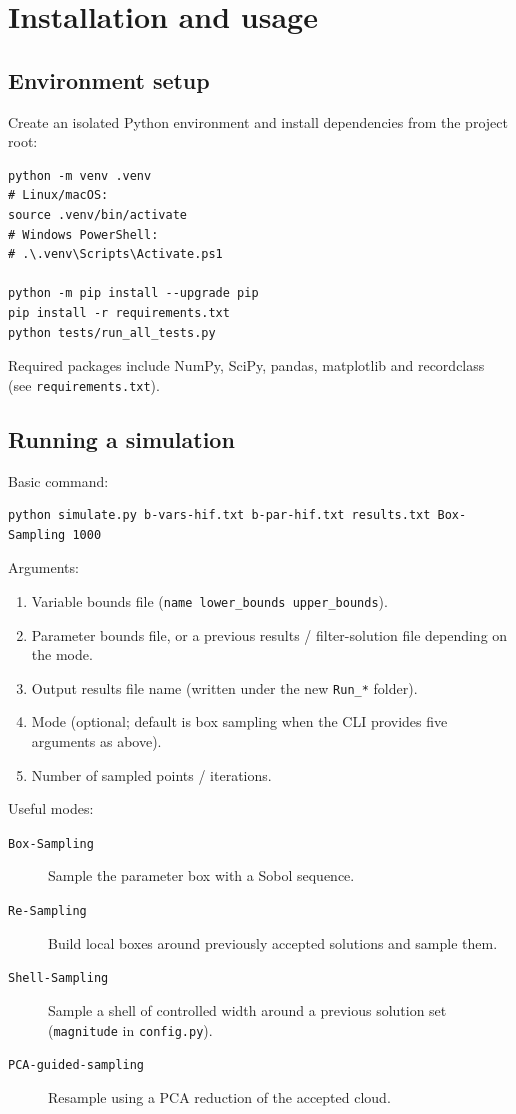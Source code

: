 \chapter{Installation and usage}

\section{Environment setup}
Create an isolated Python environment and install dependencies from the project
root:

\begin{lstlisting}
python -m venv .venv
# Linux/macOS:
source .venv/bin/activate
# Windows PowerShell:
# .\.venv\Scripts\Activate.ps1

python -m pip install --upgrade pip
pip install -r requirements.txt
python tests/run_all_tests.py
\end{lstlisting}

Required packages include NumPy, SciPy, pandas, matplotlib and recordclass
(see \texttt{requirements.txt}).

\section{Running a simulation}
Basic command:

\begin{lstlisting}
python simulate.py b-vars-hif.txt b-par-hif.txt results.txt Box-Sampling 1000
\end{lstlisting}

Arguments:
\begin{enumerate}
  \item Variable bounds file (\texttt{name lower\_bounds upper\_bounds}).
  \item Parameter bounds file, or a previous results / filter-solution file
  depending on the mode.
  \item Output results file name (written under the new \texttt{Run\_*} folder).
  \item Mode (optional; default is box sampling when the CLI provides five
  arguments as above).
  \item Number of sampled points / iterations.
\end{enumerate}

Useful modes:
\begin{description}
  \item[\texttt{Box-Sampling}] Sample the parameter box with a Sobol sequence.
  \item[\texttt{Re-Sampling}] Build local boxes around previously accepted
  solutions and sample them.
  \item[\texttt{Shell-Sampling}] Sample a shell of controlled width around a
  previous solution set (\texttt{magnitude} in \texttt{config.py}).
  \item[\texttt{PCA-guided-sampling}] Resample using a PCA reduction of the
  accepted cloud.
\end{description}

